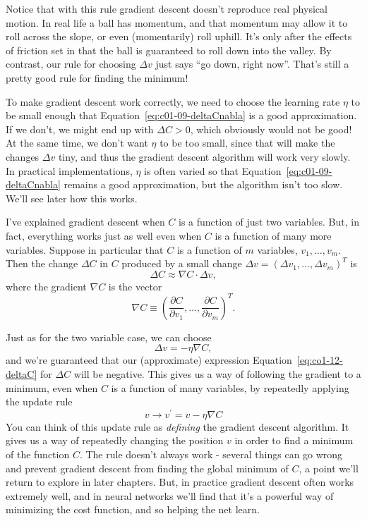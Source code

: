 Notice that with this rule gradient descent doesn't reproduce real physical motion. In real life a ball has momentum, and that momentum may allow it to roll across the slope, or even (momentarily) roll uphill. It's only after the effects of friction set in that the ball is guaranteed to roll down into the valley. By contrast, our rule for choosing $\Delta v$ just says ``go down, right now''. That's still a pretty good rule for finding the minimum!

To make gradient descent work correctly, we need to choose the learning rate $\eta$ to be small enough that Equation~\ref{eq:c01-09-deltaCnabla} is a good approximation. If we don't, we might end up with $\Delta C>0$, which obviously would not be good! At the same time, we don't want $\eta$ to be too small, since that will make the changes $\Delta v$ tiny, and thus the gradient descent algorithm will work very slowly. In practical implementations, $\eta$ is often varied so that Equation~\ref{eq:c01-09-deltaCnabla} remains a good approximation, but the algorithm isn't too slow. We'll see later how this works. 

I've explained gradient descent when $C$ is a function of just two variables. But, in fact, everything works just as well even when $C$ is a function of many more variables. Suppose in particular that $C$ is a function of $m$ variables, $v_1,\ldots,v_m$. Then the change $\Delta C$ in $C$ produced by a small change $\Delta v=\left(\Delta v_{1}, \dots, \Delta v_{m}\right)^{T}$ is 
\begin{equation}
\Delta C \approx \nabla C \cdot \Delta v,
\label{eq:co1-12-deltaC}
\end{equation}
where the gradient $\nabla C$ is the vector 
\begin{equation}
\nabla C \equiv\left(\frac{\partial C}{\partial v_{1}}, \ldots, \frac{\partial C}{\partial v_{m}}\right)^{T}.
\label{eq:c01-13-nablaC}
\end{equation}

Just as for the two variable case, we can choose 
\begin{equation}
\Delta v=-\eta \nabla C,
\label{eq:c01-14-deltaV}
\end{equation}
and we're guaranteed that our (approximate) expression Equation~\ref{eq:co1-12-deltaC} for $\Delta C$ will be negative. This gives us a way of following the gradient to a minimum, even when $C$ is a function of many variables, by repeatedly applying the update rule 
\begin{equation}
v \rightarrow v^{\prime}=v-\eta \nabla C
\label{eq:c01-15-vfromnablaC}
\end{equation}
You can think of this update rule as \textit{defining} the gradient descent algorithm. It gives us a way of repeatedly changing the position $v$ in order to find a minimum of the function $C$. The rule doesn't always work - several things can go wrong and prevent gradient descent from finding the global minimum of $C$, a point we'll return to explore in later chapters. But, in practice gradient descent often works extremely well, and in neural networks we'll find that it's a powerful way of minimizing the cost function, and so helping the net learn.

